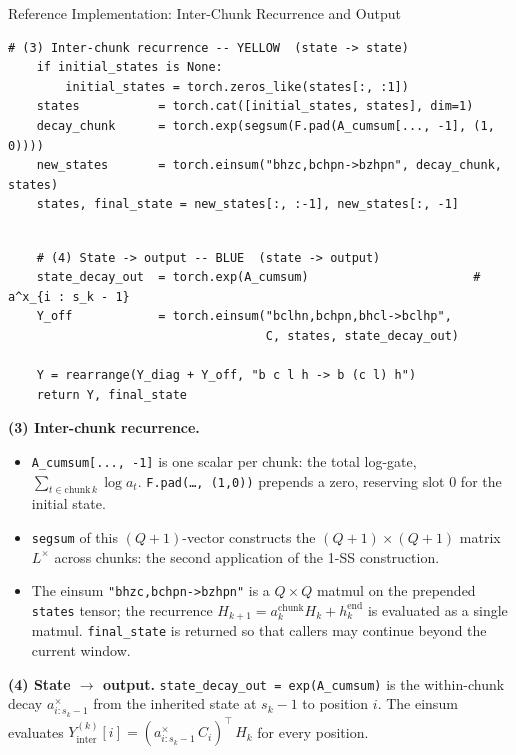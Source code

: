 \begin{frame}[fragile]{Reference Implementation: Inter-Chunk Recurrence and Output}

\begin{lstlisting}[aboveskip=0pt,belowskip=0pt,frame=none,backgroundcolor=\color{yellow!22}]
    # (3) Inter-chunk recurrence -- YELLOW  (state -> state)
    if initial_states is None:
        initial_states = torch.zeros_like(states[:, :1])
    states           = torch.cat([initial_states, states], dim=1)
    decay_chunk      = torch.exp(segsum(F.pad(A_cumsum[..., -1], (1, 0))))
    new_states       = torch.einsum("bhzc,bchpn->bzhpn", decay_chunk, states)
    states, final_state = new_states[:, :-1], new_states[:, -1]
\end{lstlisting}
\begin{lstlisting}[aboveskip=0pt,belowskip=0pt,frame=none,backgroundcolor=\color{mambablue!15}]

    # (4) State -> output -- BLUE  (state -> output)
    state_decay_out  = torch.exp(A_cumsum)                       # a^x_{i : s_k - 1}
    Y_off            = torch.einsum("bclhn,bchpn,bhcl->bclhp",
                                    C, states, state_decay_out)

    Y = rearrange(Y_diag + Y_off, "b c l h -> b (c l) h")
    return Y, final_state
\end{lstlisting}

  \vspace{0.3em}
  \textbf{(3) Inter-chunk recurrence.}
  \begin{itemize}\itemsep1pt
    \item \texttt{A\_cumsum[..., -1]} is one scalar per chunk: the total log-gate, $\sum_{t \in \text{chunk}\,k} \log a_t$. \texttt{F.pad(\dots, (1,0))} prepends a zero, reserving slot $0$ for the initial state.
    \item \texttt{segsum} of this $(Q{+}1)$-vector constructs the $(Q{+}1) \times (Q{+}1)$ matrix $L^\times$ across chunks: the second application of the 1-SS construction.
    \item The einsum \texttt{"bhzc,bchpn->bzhpn"} is a $Q{\times}Q$ matmul on the prepended \texttt{states} tensor; the recurrence $H_{k+1} = a^{\text{chunk}}_k H_k + h_k^{\text{end}}$ is evaluated as a single matmul. \texttt{final\_state} is returned so that callers may continue beyond the current window.
  \end{itemize}

  \vspace{0.2em}
  \textbf{(4) State $\to$ output.} \texttt{state\_decay\_out = exp(A\_cumsum)} is the within-chunk decay $a^\times_{i : s_k - 1}$ from the inherited state at $s_k - 1$ to position $i$. The einsum evaluates $Y_{\text{inter}}^{(k)}[i] = (a^\times_{i : s_k - 1}\, C_i)^{\!\top}\, H_k$ for every position.
\end{frame}

